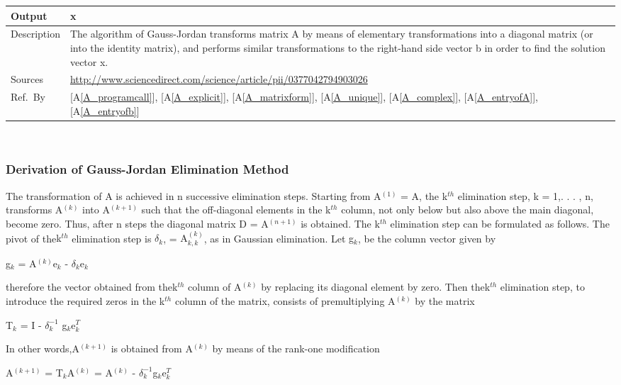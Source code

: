\documentclass[12pt]{article}
\newcommand{\colAwidth}{0.13\textwidth}
\newcommand{\colBwidth}{0.82\textwidth}
\newcommand{\aref}[1]{A\ref{#1}}
\begin{document}
{\begin{minipage}{\textwidth}
\begin{tabular}{| p{\colAwidth} | p{\colBwidth}|}
  \hline
  Output& \textbf{x}    \\
  \hline
Description& The algorithm of Gauss-Jordan transforms matrix A by means of
elementary transformations into a diagonal matrix (or into the identity matrix),
and performs similar transformations to the right-hand side vector b in order to
find the solution vector x.
  \\
  \hline
  Sources& \url{http://www.sciencedirect.com/science/article/pii/0377042794903026}\\
  \hline
  Ref.\ By & [\aref{A_programcall}], [\aref{A_explicit}], [\aref{A_matrixform}], [\aref{A_unique}], [\aref{A_complex}], [\aref{A_entryofA}], [\aref{A_entryofb}]\\
  \hline
\end{tabular}
\end{minipage}\\


\subsubsection*{Derivation of  Gauss-Jordan Elimination Method}

The transformation of A is achieved in n successive elimination steps. Starting
from {A$^{(1)}$} = A, the {k$^{th}$} elimination step, k = 1,. . . , n,
transforms {A$^{(k)}$} into {A$^{(k+1)}$} such that the off-diagonal elements in
the {k$^{th}$} column, not only below but also above the main diagonal, become
zero. Thus, after n steps the diagonal matrix D = {A$^{(n+1)}$} is obtained. The
{k$^{th}$} elimination step can be formulated as follows. The pivot of
the{k$^{th}$} elimination step is $\delta_k$, = {A$^{(k)}_{k,k}$}, as in
Gaussian elimination. Let {g$_k$}, be the column vector given by

{g$_k$} = {A$^{(k)}$}{e$_k$} - $\delta_k${e$_k$}

therefore the vector obtained from the{k$^{th}$} column of {A$^{(k)}$} by
replacing its diagonal element by zero. Then the{k$^{th}$} elimination step, to
introduce the required zeros in the {k$^{th}$} column of the matrix, consists of
premultiplying {A$^{(k)}$} by the matrix

{T$_k$} = I - $\delta_k^{-1}$ {g$_k$}{e$_k^T$}

In other words,{A$^{(k+1)}$} is obtained from {A$^{(k)}$} by means of the
rank-one modification

{A$^{(k+1)}$ = {T$_k$}{A$^{(k)}$} = {A$^{(k)}$} -
$\delta_k^{-1}${g$_k$}{e$_k^T$}

}}
\end{document}
